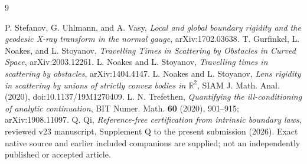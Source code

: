 \begin{thebibliography}{9}
\raggedright
{}
P. Stefanov, G. Uhlmann, and A. Vasy,
\emph{Local and global boundary rigidity and the geodesic X-ray transform
in the normal gauge}, arXiv:1702.03638.
T. Gurfinkel, L. Noakes, and L. Stoyanov,
\emph{Travelling Times in Scattering by Obstacles in Curved Space},
arXiv:2003.12261.
L. Noakes and L. Stoyanov,
\emph{Travelling times in scattering by obstacles}, arXiv:1404.4147.
L. Noakes and L. Stoyanov,
\emph{Lens rigidity in scattering by unions of strictly convex bodies in
$\mathbb R^2$}, SIAM J. Math. Anal. (2020),
doi:10.1137/19M1270409.
L. N. Trefethen, \emph{Quantifying the ill-conditioning of analytic
continuation}, BIT Numer. Math. \textbf{60} (2020), 901--915;
arXiv:1908.11097.
Q. Qi, \emph{Reference-free certification from intrinsic boundary laws},
reviewed v23 manuscript, Supplement Q to the present submission (2026).
Exact native source and earlier included companions are supplied;
not an independently published or accepted article.
\end{thebibliography}
